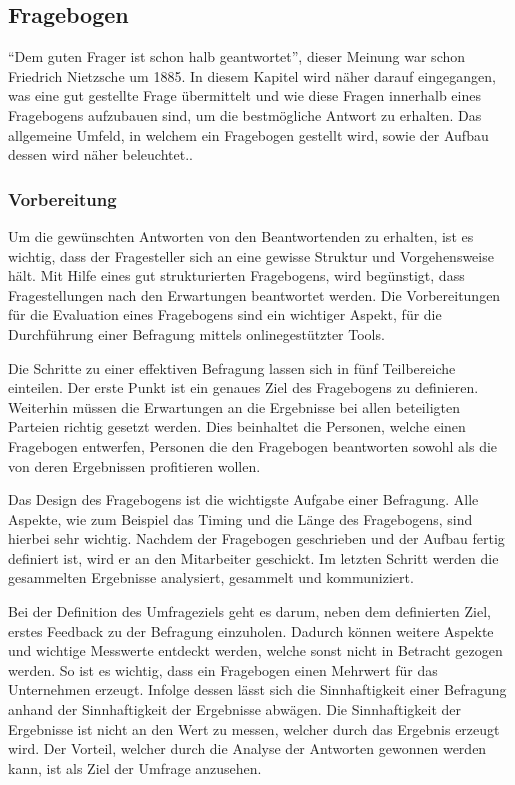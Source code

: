 \subsection{Fragebogen}
\label{acqusition}
\enquote{Dem guten Frager ist schon halb geantwortet}, dieser Meinung war schon Friedrich Nietzsche um 1885. 
In diesem Kapitel wird näher darauf eingegangen, was eine gut gestellte Frage übermittelt und wie diese Fragen innerhalb eines Fragebogens aufzubauen sind, um die bestmögliche Antwort zu erhalten.
Das allgemeine Umfeld, in welchem ein Fragebogen gestellt wird, sowie der Aufbau dessen wird näher beleuchtet.\autocite{Nietzsche}.

\subsubsection{Vorbereitung} 
Um die gewünschten Antworten von den Beantwortenden zu erhalten, ist es wichtig, dass der Fragesteller sich an eine gewisse Struktur und Vorgehensweise hält.
Mit Hilfe eines gut strukturierten Fragebogens, wird begünstigt, dass Fragestellungen nach den Erwartungen beantwortet werden.
Die Vorbereitungen für die Evaluation eines Fragebogens sind ein wichtiger Aspekt, für die Durchführung einer Befragung mittels onlinegestützter Tools. 

Die Schritte zu einer effektiven Befragung lassen sich in fünf Teilbereiche einteilen. 
Der erste Punkt ist ein genaues Ziel des Fragebogens zu definieren. 
Weiterhin müssen die Erwartungen an die Ergebnisse bei allen beteiligten Parteien richtig gesetzt werden. 
Dies beinhaltet die Personen, welche einen Fragebogen entwerfen, Personen die den Fragebogen beantworten sowohl als die von deren Ergebnissen profitieren wollen.\autocite[Preparing for the Survey]{Perfect}

Das Design des Fragebogens ist die wichtigste Aufgabe einer Befragung. 
Alle Aspekte, wie zum Beispiel das Timing und die Länge des Fragebogens, sind hierbei sehr wichtig. 
Nachdem der Fragebogen geschrieben und der Aufbau fertig definiert ist, wird er an den Mitarbeiter geschickt.
Im letzten Schritt werden die gesammelten Ergebnisse analysiert, gesammelt und kommuniziert\autocite[Preparing for the Survey]{Perfect}.

Bei der Definition des Umfrageziels geht es darum, neben dem definierten Ziel, erstes Feedback zu der Befragung einzuholen. 
Dadurch können weitere Aspekte und wichtige Messwerte entdeckt werden, welche sonst nicht in Betracht gezogen werden.
So ist es wichtig, dass ein Fragebogen einen Mehrwert für das Unternehmen erzeugt. 
Infolge dessen lässt sich die Sinnhaftigkeit einer Befragung anhand der Sinnhaftigkeit der Ergebnisse abwägen. 
Die Sinnhaftigkeit der Ergebnisse ist nicht an den Wert zu messen, welcher durch das Ergebnis erzeugt wird. 
Der Vorteil, welcher durch die Analyse der Antworten gewonnen werden kann, ist als Ziel der Umfrage anzusehen\autocite[Defining Survey Goals]{Perfect}. 

